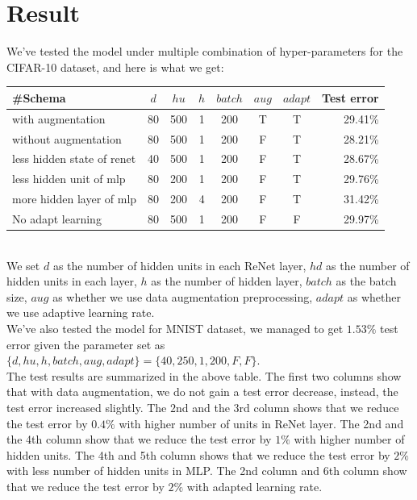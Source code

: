\documentclass[final,leqno]{siamltex}
\begin{document}
\section{Result} \label{result}
We've tested the model under multiple combination of hyper-parameters for the CIFAR-10 dataset, and here is what we get:
\begin{center}
\end{center}
\begin{center}
\begin{tabular}{l c c c c c c r}
\hline
\#Schema & $d$ & $hu$ & $h$ & $batch$ & $aug$ & $adapt$ & Test error\\
\hline
with augmentation & 80 & 500 & 1 & 200 & T & T & 29.41\%\\
without augmentation & 80 & 500 & 1 & 200 & F & T & 28.21\%\\
less hidden state of renet & 40 & 500 & 1 & 200 & F & T & 28.67\%\\
less hidden unit of mlp & 80 & 200 & 1 & 200 & F & T & 29.76\%\\
more hidden layer of mlp & 80 & 200 & 4 & 200 & F & T & 31.42\%\\
No adapt learning & 80 & 500 & 1 & 200 & F & F & 29.97\%\\
\hline
\end{tabular}	
\end{center} 
~\\
We set $d$ as the number of hidden units in each ReNet layer, $hd$ as the number of hidden units in each layer, $h$ as the number of hidden layer, $batch$ as the batch size, $aug$ as whether we use data augmentation preprocessing, $adapt$ as whether we use adaptive learning rate.\\

We've also tested the model for MNIST dataset, we managed to get $1.53\%$ test error given the parameter set as $\{d, hu, h, batch, aug, adapt\}=\{40, 250, 1, 200, F, F\}$.\\

The test results are summarized in the above table. The first two columns show that with data augmentation, we do not gain a test error decrease, instead, the test error increased slightly. The $2$nd and the $3$rd column shows that we reduce the test error by $0.4\%$ with higher number of units in ReNet layer. The 2nd and the 4th column show that we reduce the test error by $1\%$ with higher number of hidden units. The 4th and 5th column shows that we reduce the test error by $2\%$ with less number of hidden units in MLP. The 2nd column and 6th column show that we reduce the test error by $2\%$ with adapted learning rate.\\
\end{document}
